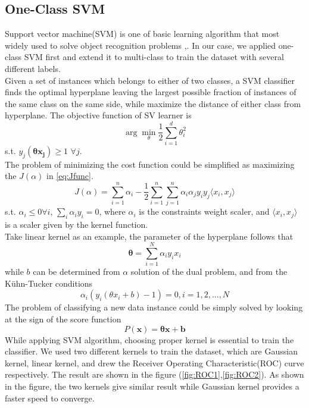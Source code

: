 \documentclass{article}
\newcommand{\argmin}{\arg\!\min}
\begin{document}
\subsection{One-Class SVM}
Support vector machine(SVM) is one of basic learning algorithm that most widely used to solve object recognition problems \cite{dalal2005histograms},\cite{SVMforRecogintion}. In our case, we applied one-class SVM first and extend it to multi-class to train the dataset with several different labels.\\
Given a set of instances which belongs to either of two classes, a SVM classifier finds the optimal hyperplane leaving the largest possible fraction of instances of the same class on the same side, while maximize the distance of either class from hyperplane. The objective function of SV learner is
\begin{equation}
\argmin_\theta \frac{1}{2}\sum_{i=1}^d \theta_i^2
\end{equation}
s.t. $y_j(\mathbf{\theta x_j})\geq 1$ $\forall j$.\\
The problem of minimizing the cost function could be simplified as maximizing the $J(\alpha)$ in \ref{eq:Jfunc}.
\begin{equation}
J(\alpha) = \sum_{i=1}^n \alpha_i - \frac{1}{2}\sum_{i=1}^n\sum_{j=1}^n \alpha_i \alpha_jy_iy_j\langle x_i,x_j\rangle
\label{eq:Jfunc}
\end{equation}
s.t. $\alpha_i\leq 0 \forall i$, $\sum_i \alpha_iy_i = 0$,
where $\alpha_i$ is the constraints weight scaler, and $\langle x_i,x_j \rangle$ is a scaler given by the kernel function.\\
Take linear kernel as an example, the parameter of the hyperplane follows that
\begin{equation}
\mathbf{\theta} = \sum_{i=1}^N\alpha_i y_i x_i
\end{equation}
while $b$ can be determined from $\alpha$ solution of the dual problem, and from the Kühn-Tucker conditions
\begin{equation}
\alpha_i(y_i(\theta x_i+b)-1) = 0, i = 1,2,...,N
\end{equation}
The problem of classifying a new data instance could be simply solved by looking at the sign of the score function 
\begin{equation}
P(\mathbf{x}) = \mathbf{\theta}\mathbf{x}+\mathbf{b}
\label{eq:score}
\end{equation}
While applying SVM algorithm, choosing proper kernel is essential to train the classifier. We used two different kernels to train the dataset, which are Gaussian kernel, linear kernel, and drew the Receiver	Operating Characteristic(ROC) curve respectively. The result are shown in the figure (\ref{fig:ROC1},\ref{fig:ROC2}). As shown in the figure, the two kernels give similar result while Gaussian kernel provides a faster speed to converge.\\
\end{document}
